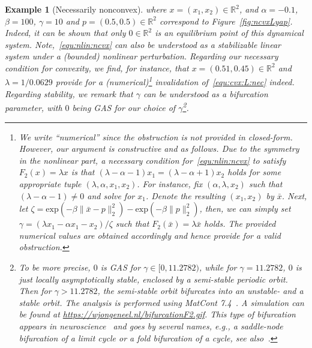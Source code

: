 \documentclass[letterpaper, 10 pt, conference]{ieeeconf}  %
\theoremstyle{mystyle}
\newtheorem{example}[theorem]{Example}
\begin{document}
\begin{example}[Necessarily nonconvex]
where $x=(x_1,x_2)\in \mathbb{R}^2$, and $\alpha=-0.1$, $\beta=100$, $\gamma=10$ and $p=(0.5,0.5)\in \mathbb{R}^2$ correspond to Figure~\ref{fig:ncvxLyap}. Indeed, it can be shown that only $0\in \mathbb{R}^2$ is an equilibrium point of this dynamical system. Note,~\eqref{equ:nlin:ncvx} can also be understood as a stabilizable linear system under a (bounded) nonlinear perturbation. Regarding our necessary condition for convexity, we find, for instance, that $x=(0.51,0.45)\in \mathbb{R}^2$ and $\lambda=1/0.0629$ provide for a (numerical)\footnote{{We write ``\textit{numerical}'' since the obstruction is not provided in closed-form. However, our argument is constructive and as follows. Due to the symmetry in the nonlinear part, a necessary condition for~\eqref{equ:nlin:ncvx} to satisfy $F_2(x)=\lambda x$ is that $(\lambda-\alpha-1)x_1=(\lambda-\alpha+1)x_2$ holds for some appropriate tuple $(\lambda,\alpha,x_1,x_2)$. For instance, fix $(\alpha,\lambda,x_2)$ such that $(\lambda-\alpha-1)\neq 0$ and solve for $x_1$. Denote the resulting $(x_1,x_2)$ by $\bar{x}$. Next, let $\zeta=\mathrm{exp}(-\beta \|\bar{x}-p\|_2^2 )-\mathrm{exp}(-\beta \|p\|_2^2 )$, then, we can simply set $\gamma=(\lambda x_1-\alpha x_1 - x_2)/\zeta$ such that $F_2(\bar{x})=\lambda \bar{x}$ holds. The provided numerical values are obtained accordingly and hence provide for a valid obstruction.}} invalidation of~\eqref{equ:cvx:L:nec} indeed. {Regarding stability, we remark that $\gamma$ can be understood as a bifurcation parameter, with $0$ being GAS for our choice of $\gamma$}\footnote{{To be more precise, $0$ is GAS for $\gamma \in [0,11.2782)$, while for $\gamma = 11.2782$, $0$ is just locally asymptotically stable, enclosed by a semi-stable periodic orbit. Then for $\gamma>11.2782$, the semi-stable orbit bifurcates into an unstable- and a stable orbit. The analysis is performed using MatCont 7.4~\cite{ref:dhooge2008new}. A simulation can be found at \url{https://wjongeneel.nl/bifurcationF2.gif}. This type of bifurcation appears in neuroscience~\cite[Fig. 1.7]{ref:izhikevich2001synchronization} and goes by several names, \textit{e.g.}, a saddle-node bifurcation of a limit cycle or a fold bifurcation of a cycle, see also~\cite[Sec. 8.4]{ref:strogatz}.}}.
\end{example}
\end{document}
